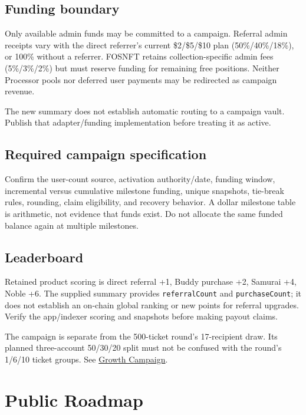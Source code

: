 \documentclass[
  10pt,
  letterpaper,
]{article}
\begin{document}
\subsection{Funding boundary}\label{funding-boundary}

Only available admin funds may be committed to a campaign. Referral
admin receipts vary with the direct referrer's current \$2/\$5/\$10 plan
(50\%/40\%/18\%), or 100\% without a referrer. FOSNFT retains
collection-specific admin fees (5\%/3\%/2\%) but must reserve funding
for remaining free positions. Neither Processor pools nor deferred user
payments may be redirected as campaign revenue.

The new summary does not establish automatic routing to a campaign
vault. Publish that adapter/funding implementation before treating it as
active.

\subsection{Required campaign
specification}\label{required-campaign-specification}

Confirm the user-count source, activation authority/date, funding
window, incremental versus cumulative milestone funding, unique
snapshots, tie-break rules, rounding, claim eligibility, and recovery
behavior. A dollar milestone table is arithmetic, not evidence that
funds exist. Do not allocate the same funded balance again at multiple
milestones.

\subsection{Leaderboard}\label{leaderboard}

Retained product scoring is direct referral +1, Buddy purchase +2,
Samurai +4, Noble +6. The supplied summary provides
\texttt{referralCount} and \texttt{purchaseCount}; it does not establish
an on-chain global ranking or new points for referral upgrades. Verify
the app/indexer scoring and snapshots before making payout claims.

The campaign is separate from the 500-ticket round's 17-recipient draw.
Its planned three-account 50/30/20 split must not be confused with the
round's 1/6/10 ticket groups. See
\href{https://github.com/alirezaehteshampour/Fos-Doc/blob/main/content/docs/campaigns/growth.mdx}{Growth
Campaign}.

\section{Public Roadmap}\label{public-roadmap}
\end{document}
